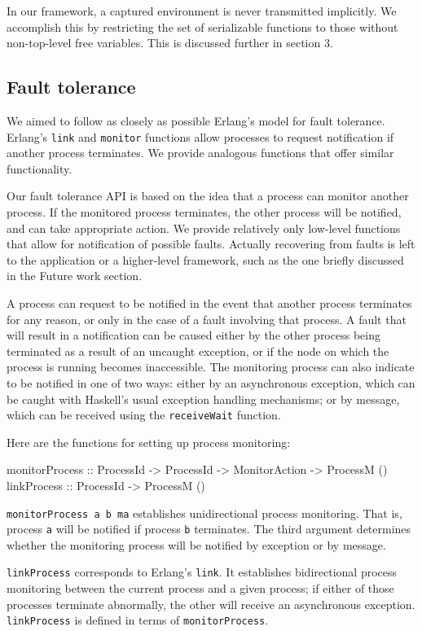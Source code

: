 \documentclass[preprint]{sigplanconf}
\begin{document}
In our framework, a captured environment is never transmitted implicitly. We accomplish this by restricting the set of serializable functions to those without non-top-level free variables. This is discussed further in section 3.

\subsection{Fault tolerance}
We aimed to follow as closely as possible Erlang's model for fault tolerance. Erlang's \texttt{link} and \texttt{monitor} functions allow processes to request notification if another process terminates. We provide analogous functions that offer similar functionality.

Our fault tolerance API is based on the idea that a process can monitor another process. If the monitored process terminates, the other process will be notified, and can take appropriate action. We provide relatively only low-level functions that allow for notification of possible faults. Actually recovering from faults is left to the application or a higher-level framework, such as the one briefly discussed in the Future work section.

A process can request to be notified in the event that another process terminates for any reason, or only in the case of a fault involving that process. A fault that will result in a notification can be caused either by the other process being terminated as a result of an uncaught exception, or if the node on which the process is running becomes inaccessible. The monitoring process can also indicate to be notified in one of two ways: either by an asynchronous exception, which can be caught with Haskell's usual exception handling mechanisms; or by message, which can be received using the \texttt{receiveWait} function.

Here are the functions for setting up process monitoring:

\begin{code}
monitorProcess :: ProcessId -> ProcessId -> MonitorAction -> ProcessM ()
linkProcess :: ProcessId -> ProcessM ()
\end{code}

\lstinline!monitorProcess a b ma! establishes unidirectional process monitoring. That is, process \texttt{a} will be notified if process \texttt{b} terminates. The third argument determines whether the monitoring process will be notified by exception or by message.

\texttt{linkProcess} corresponds to Erlang's \texttt{link}. It establishes bidirectional process monitoring between the current process and a given process; if either of those processes terminate abnormally, the other will receive an asynchronous exception. \texttt{linkProcess} is defined in terms of \texttt{monitorProcess}. 
\end{document}
